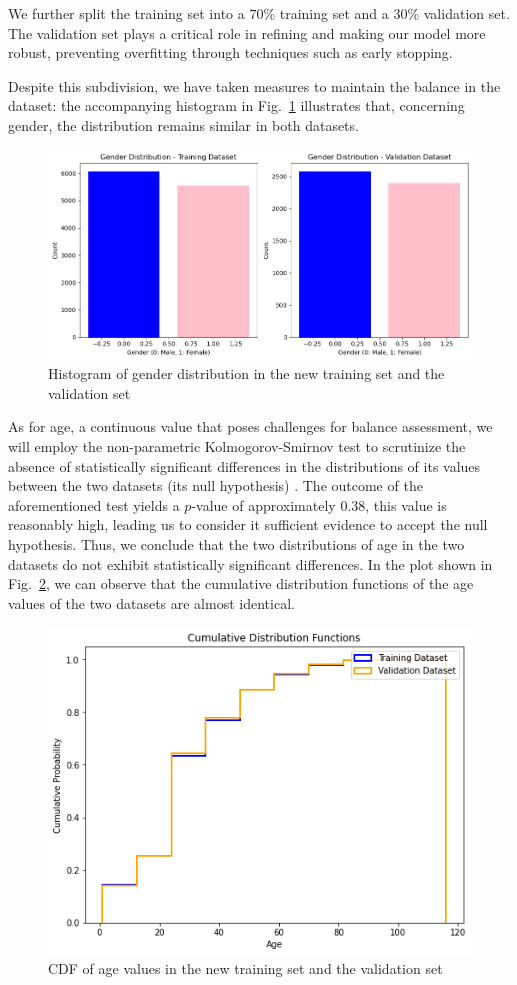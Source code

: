 We further split the training set into a $70\%$ training set and a $30\%$
validation set. The validation set plays a critical role in refining
and making our model more robust, preventing overfitting through techniques
such as early stopping.

Despite this subdivision, we have taken measures to maintain the
balance in the dataset: the accompanying histogram  in Fig.~\ref{3gender2}
illustrates that, concerning gender,
the distribution remains similar in both datasets.

\begin{figure}[htbp]
    \centerline{\includegraphics[width=.5\textwidth]{images/dataset/gender2.png}}
    \caption{Histogram of gender distribution in the new training
    set and the validation set}
    \label{3gender2}
\end{figure}

As for age, a continuous value that poses challenges for balance
assessment, we will employ the non-parametric Kolmogorov-Smirnov test
to scrutinize the absence of statistically significant differences in
the distributions of its values between the two datasets
(its null hypothesis) \cite{app2}.
The outcome of the aforementioned test yields a $p$-value of approximately
$0.38$, this value is reasonably high,
leading us to consider it sufficient evidence to accept the null hypothesis.
Thus, we conclude that the two distributions of age in the two
datasets do not exhibit statistically significant differences.
In the plot shown in Fig.~\ref{4CDFage}, we can observe that
the cumulative distribution functions of the age values of the
two datasets are almost identical.

\begin{figure}[htbp]
    \centerline{\includegraphics[width=.5\textwidth]{images/dataset/CDF_age.png}}
    \caption{CDF of age values in the
    new training set and the validation set}
    \label{4CDFage}
\end{figure}

